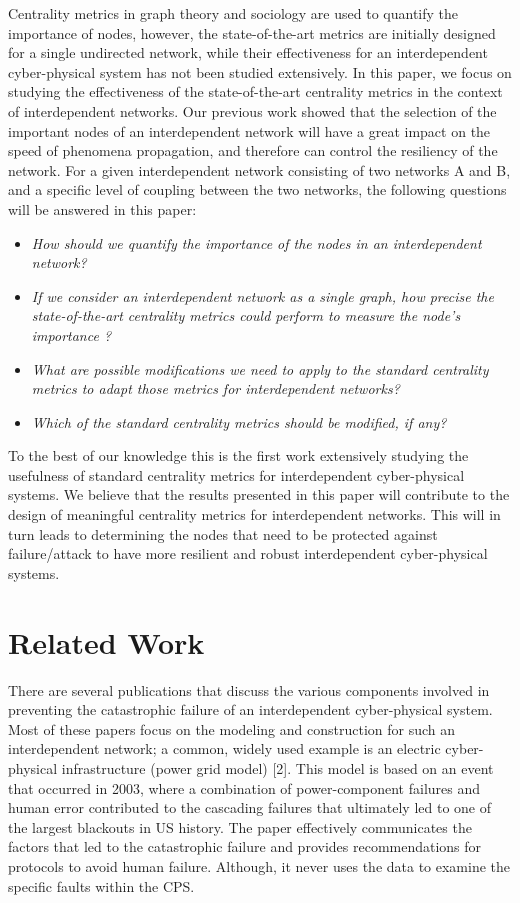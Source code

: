 \documentclass[letterpaper, 10 pt, conference]{ieeeconf}  %
\begin{document}
Centrality metrics in graph theory and sociology are used to quantify the importance of nodes, however, the state-of-the-art metrics are initially designed for a single undirected network, while their effectiveness for an interdependent cyber-physical system has not been studied extensively. In this paper, we focus on studying the effectiveness of the state-of-the-art centrality metrics in the context of interdependent networks. Our previous work showed that the selection of the important nodes of an interdependent network will have a great impact on the speed of phenomena propagation, and therefore can control the resiliency of the network. For a given interdependent network consisting of two networks A and B, and a specific level of coupling between the two networks, the following questions will be answered in this paper:
\begin{itemize}
\item \textit{How should we quantify the importance of the nodes in an interdependent network?}
\item \textit{If we consider an interdependent network as a single graph, how precise the state-of-the-art centrality metrics could perform to measure the node's importance ?}
\item \textit{What are  possible modifications we need to apply to the standard centrality metrics to adapt those metrics for interdependent networks?}
\item \textit{Which of the standard centrality metrics should be modified, if any?}
\end{itemize}
To the best of our knowledge this is the first work extensively studying the usefulness of standard centrality metrics for interdependent cyber-physical systems. We believe that the results presented in this paper will contribute to the design of meaningful centrality metrics for interdependent networks. This will in turn leads to determining the nodes that need to be protected against failure/attack to have more resilient and robust interdependent cyber-physical systems.
\section{Related Work}
There are several publications that discuss the various components involved in preventing the catastrophic failure of an interdependent cyber-physical system. Most of these papers focus on the modeling and construction for such an interdependent network; a common, widely used example is an electric cyber-physical infrastructure (power grid model) [2]. This model is based on an event that occurred in 2003, where a combination of power-component failures and human error contributed to the cascading failures that ultimately led to one of the largest blackouts in US history. The paper effectively communicates the factors that led to the catastrophic failure and provides recommendations for protocols to avoid human failure. Although, it never uses the data to examine the specific faults within the CPS.
\end{document}
